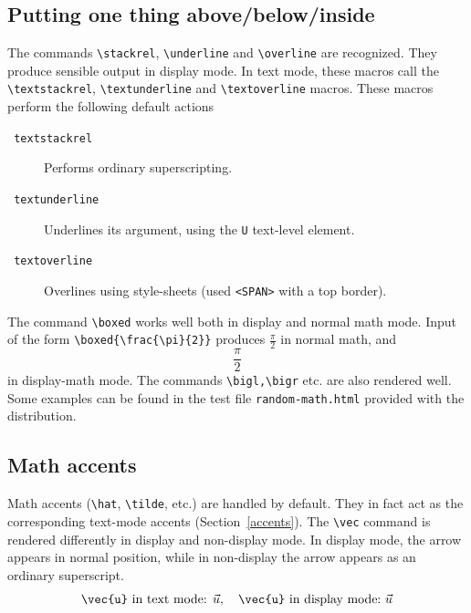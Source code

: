 \subsection{Putting one thing above/below/inside}

The commands \verb+\stackrel+,  \verb+\underline+ and \verb+\overline+
are recognized.
They produce sensible output in display mode.
In text mode, these macros call the \verb+\textstackrel+,
\verb+\textunderline+ and \verb+\textoverline+ macros.
These macros perform the following default actions
\begin{description}
\item[\texttt{ textstackrel}] Performs ordinary superscripting.
\item[\texttt{ textunderline}] Underlines its argument, using the
\verb+U+ text-level element.
\item[\texttt{ textoverline}] Overlines using style-sheets (used {\tt <SPAN>} with a top border). 
\end{description}

\index{\verb+\boxed+} The command \verb+\boxed+ works well both in display and normal math mode. Input of the form \verb+\boxed{\frac{\pi}{2}}+ produces $\boxed{\frac{\pi}{2}}$ in normal math, and 
$$\boxed{\frac{\pi}{2}}$$
in display-math mode. The commands \verb+\bigl,\bigr+ etc. are also rendered well. Some examples can be found \ifhevea {}\else in the test file {\tt random-math.html} provided with the distribution\fi.

\subsection{Math accents}
Math accents (\verb+\hat+, \verb+\tilde+, etc.) are
handled\label{mathaccents} by default.  They in fact act as the
corresponding text-mode accents (Section~\ref{accents}).  The \verb+\vec+
command is rendered differently in display and non-display mode. In
display mode, the arrow appears in normal position, while in
non-display the arrow appears as an ordinary superscript.
$$
\mbox{\texttt{\textbackslash{}vec\{u\}} in text mode: $\vec{u}$},\quad
\mbox{\texttt{\textbackslash{}vec\{u\}} in display mode:}~\vec{u}
$$

